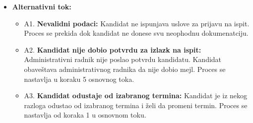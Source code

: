 \begin{itemize}
\item \textbf{Alternativni tok:}  
   \begin{itemize}
   \item A1. \textbf{Nevalidni podaci:}
  Kandidat ne ispunjava uslove za prijavu na ispit. Proces se prekida dok kandidat ne donese svu neophodnu dokumenatciju.
  \item A2. \textbf{Kandidat nije dobio potvrdu za izlazk na ispit:}
  Administrativni radnik nije poslao potvrdu kandidatu. Kandidat obaveštava administrativnog radnika da nije dobio mejl. Proces se nastavlja u koraku 5 osnovnog toka.
  \item A3. \textbf{Kandidat odustaje od izabranog termina:}
  Kandidat je iz nekog razloga odustao od izabranog termina i želi da promeni termin. Proces se nastavlja od koraka 1 u osnovnom toku.
   \end{itemize}

\end{itemize}  
